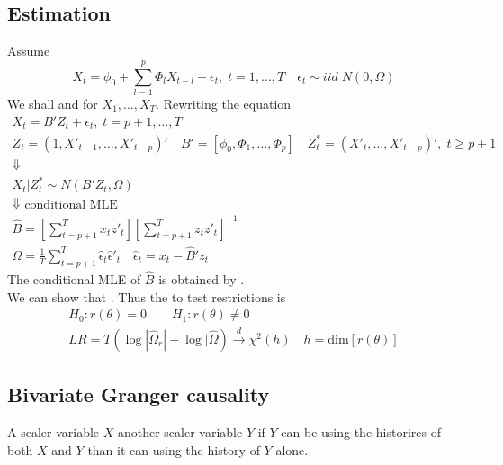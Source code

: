 \subsection{Estimation}

Assume 
\begin{equation*}
    X_t = \phi_0 + \sum_{l=1}^{p}\Phi_l X_{t-l} + \epsilon_t,\; t=1,\ldots,T\quad \epsilon_t\sim iid\; N(0,\Omega)
\end{equation*}
We shall  and  for $X_1,\ldots,X_T$.
Rewriting the equation
\begin{gather*}
    X_t = B'Z_t + \epsilon_t,\; t=p+1,\ldots,T\\
    Z_t = (1,X'_{t-1},\ldots,X'_{t-p})'\quad B' = [\phi_0,\Phi_1,\ldots,\Phi_p]\quad Z^*_t = (X'_{t},\ldots,X'_{t-p})',\; t\geq p+1\\
    \Downarrow\\
    X_t | Z^*_t \sim N(B'Z_t,\Omega)\\
    \Downarrow\text{ conditional MLE}\\
    \hat{B} = \left[\sum_{t=p+1}^{T} x_t z'_t\right]\left[\sum_{t=p+1}^{T}z_t z'_t\right]^{-1}\\
    \hat{\Omega} = \frac{1}{T}\sum_{t=p+1}^{T} \hat{\epsilon}_t \hat{\epsilon}'_t\quad \hat{\epsilon}_t = x_t - \hat{B}' z_t
\end{gather*}
The conditional MLE of $\hat{B}$ is obtained by .\\

We can show that .
Thus the  to test restrictions is
\begin{gather*}
    H_0 : r(\theta)=0\qquad H_1: r(\theta)\neq 0\\
    LR = T(\log |\hat{\Omega}_r| - \log|\hat{\Omega}) \xrightarrow{d} \chi^2(h)\quad h = \text{dim}[r(\theta)]
\end{gather*}

\subsection{Bivariate Granger causality}

A scaler variable $X$  another scaler variable $Y$ if $Y$ can be  using the historires of both $X$ and $Y$ than it can using the history of $Y$ alone.

